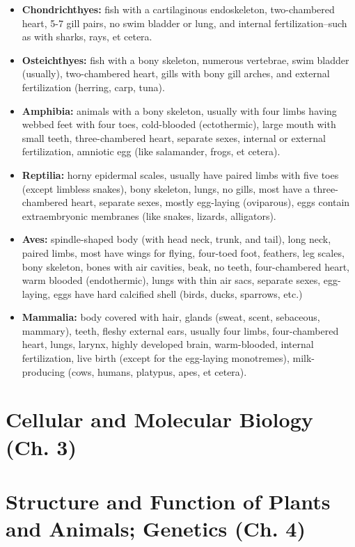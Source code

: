 \documentclass[10pt, landscape]{article}
\begin{document}
\begin{multicols}{2}
\begin{itemize}
				\begin{itemize}
					\item \textbf{Chondrichthyes:} fish with a cartilaginous endoskeleton, two-chambered heart, 5-7 gill pairs, no swim bladder or lung, and internal fertilization--such as with sharks, rays, et cetera. 
					\item \textbf{Osteichthyes:} fish with a bony skeleton, numerous vertebrae, swim bladder (usually), two-chambered heart, gills with bony gill arches, and external fertilization (herring, carp, tuna).
					\item \textbf{Amphibia:} animals with a bony skeleton, usually with four limbs having webbed feet with four toes, cold-blooded (ectothermic), large mouth with small teeth, three-chambered heart, separate sexes, internal or external fertilization, amniotic egg (like salamander, frogs, et cetera).
					\item \textbf{Reptilia:} horny epidermal scales, usually have paired limbs with five toes (except limbless snakes), bony skeleton, lungs, no gills, most have a three-chambered heart, separate sexes, mostly egg-laying (oviparous), eggs contain extraembryonic membranes (like snakes, lizards, alligators).
					\item \textbf{Aves:} spindle-shaped body (with head neck, trunk, and tail), long neck, paired limbs, most have wings for flying, four-toed foot, feathers, leg scales, bony skeleton, bones with air cavities, beak, no teeth, four-chambered heart, warm blooded (endothermic), lungs with thin air sacs, separate sexes, egg-laying, eggs have hard calcified shell (birds, ducks, sparrows, etc.)
					\item \textbf{Mammalia:} body covered with hair, glands (sweat, scent, sebaceous, mammary), teeth, fleshy external ears, usually four limbs, four-chambered heart, lungs, larynx, highly developed brain, warm-blooded, internal fertilization, live birth (except for the egg-laying monotremes), milk-producing (cows, humans, platypus, apes, et cetera).
				\end{itemize}
			\end{itemize}
		\section{Cellular and Molecular Biology (Ch. 3)}
		\section{Structure and Function of Plants and Animals; Genetics (Ch. 4)}

\end{multicols}
\end{document}
